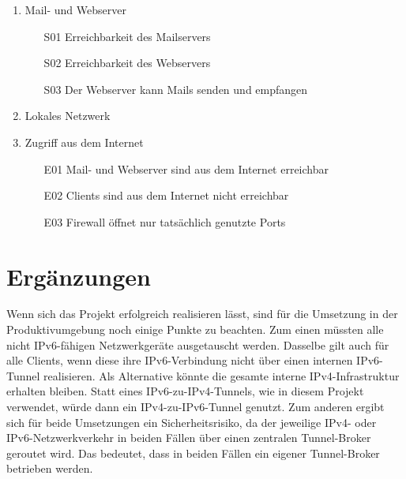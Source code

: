 \begin{enumerate}
	\item Mail- und Webserver
		\begin{itemize}
			\item[S01] Erreichbarkeit des Mailservers
			\item[S02] Erreichbarkeit des Webservers
			\item[S03] Der Webserver kann Mails senden und empfangen
		\end{itemize}
	\item Lokales Netzwerk 
	\item Zugriff aus dem Internet
		\begin{itemize}
			\item[E01] Mail- und Webserver sind aus dem Internet erreichbar 
			\item[E02] Clients sind aus dem Internet nicht erreichbar
			\item[E03] Firewall öffnet nur tatsächlich genutzte Ports 
		\end{itemize}
\end{enumerate}


\section{Ergänzungen}



Wenn sich das Projekt erfolgreich realisieren lässt, sind für die Umsetzung in der Produktivumgebung noch einige Punkte zu beachten. Zum einen müssten alle nicht IPv6-fähigen Netzwerkgeräte ausgetauscht werden. Dasselbe gilt auch für alle Clients, wenn diese ihre IPv6-Verbindung nicht über einen internen IPv6-Tunnel realisieren. Als Alternative könnte die gesamte interne IPv4-Infrastruktur erhalten bleiben. Statt eines IPv6-zu-IPv4-Tunnels, wie in diesem Projekt verwendet, würde dann ein IPv4-zu-IPv6-Tunnel genutzt. Zum anderen ergibt sich für beide Umsetzungen ein Sicherheitsrisiko, da der jeweilige IPv4- oder IPv6-Netzwerkverkehr in beiden Fällen über einen zentralen Tunnel-Broker geroutet wird. Das bedeutet, dass in beiden Fällen ein eigener Tunnel-Broker betrieben werden.